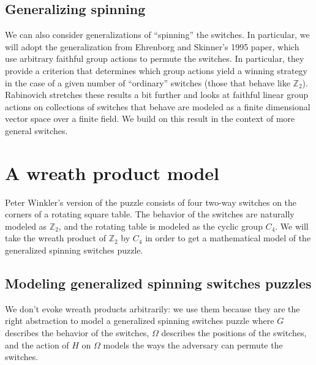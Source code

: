 
\subsection{Generalizing spinning}
We can also consider generalizations of ``spinning'' the switches.
In particular, we will adopt the generalization from
Ehrenborg and Skinner's \cite{Ehrenborg1995} 1995 paper, which use
arbitrary faithful group actions to permute the switches.
In particular, they provide a criterion that determines which group actions
yield a winning strategy in the case of a given number of ``ordinary'' switches
(those that behave like $\mathbb Z_2$).
Rabinovich \cite{Rabinovich2022} stretches these results a bit further and
looks at faithful linear group actions on collections of switches that behave
are modeled as a finite dimensional vector space over a finite field.
We build on this result in the context of more general switches.

\section{A wreath product model}
\label{sec:WreathModel}
Peter Winkler's version of the puzzle consists of four two-way switches on the
corners of a rotating square table.
The behavior of the switches are naturally modeled as $\mathbb Z_2$, and
the rotating table is modeled as the cyclic group $C_4$. We will take the
wreath product of $\mathbb Z_2$ by $C_4$ in order to get a mathematical model
of the generalized spinning switches puzzle.

\subsection{Modeling generalized spinning switches puzzles}
We don't evoke wreath products arbitrarily: we use them because they are the
right abstraction to model a generalized spinning switches puzzle where
$G$ describes the behavior of the switches,
$\Omega$ describes the positions of the switches, and
the action of $H$ on $\Omega$ models the ways the adversary can permute the switches.

